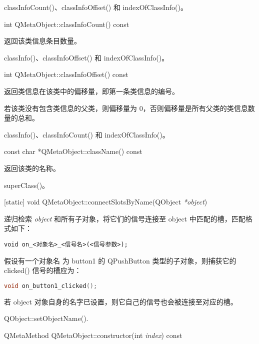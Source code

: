 
\begin{seeAlso}
classInfoCount()、classInfoOffset() 和 indexOfClassInfo()。
\end{seeAlso}

int QMetaObject::classInfoCount() const

返回该类信息条目数量。

\begin{seeAlso}
classInfo()、classInfoOffset() 和 indexOfClassInfo()。
\end{seeAlso}

int QMetaObject::classInfoOffset() const

返回类信息在该类中的偏移量，即第一条类信息的编号。

若该类没有包含类信息的父类，则偏移量为 0，否则偏移量是所有父类的类信息数量的总和。

\begin{seeAlso}
classInfo()、classInfoCount() 和 indexOfClassInfo()。
\end{seeAlso}

const char *QMetaObject::className() const

返回该类的名称。

\begin{seeAlso}
superClass()。
\end{seeAlso}

[static] void QMetaObject::connectSlotsByName(QObject \emph{*object})

递归检索 \emph{object} 和所有子对象，将它们的信号连接至 object 中匹配的槽，匹配格式如下：

\begin{lstlisting}
void on_<对象名>_<信号名>(<信号参数>);
\end{lstlisting}

假设有一个对象名 为 button1 的 QPushButton 类型的子对象，则捕获它的 clicked() 信号的槽应为：

\begin{lstlisting}[language=C++]
void on_button1_clicked();
\end{lstlisting}

若 object 对象自身的名字已设置，则它自己的信号也会被连接至对应的槽。

\begin{seeAlso}
QObject::setObjectName().
\end{seeAlso}

QMetaMethod QMetaObject::constructor(int \emph{index}) const


